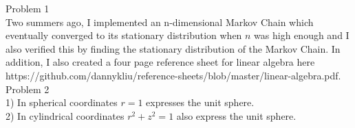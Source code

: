 \documentclass[12pt,letterpaper,cm]{hmcpset}
\begin{document}
Problem 1 \\
Two summers ago, I implemented an n-dimensional Markov Chain which eventually converged to its stationary distribution when $n$ was high enough and I also verified this by finding the stationary distribution of the Markov Chain. In addition, I also created a four page reference sheet for linear algebra here https://github.com/dannykliu/reference-sheets/blob/master/linear-algebra.pdf. \\

Problem 2 \\
1) In spherical coordinates $r = 1$ expresses the unit sphere. \\
2) In cylindrical coordinates $r^2 + z^2 = 1$ also express the unit sphere.
\end{document}
